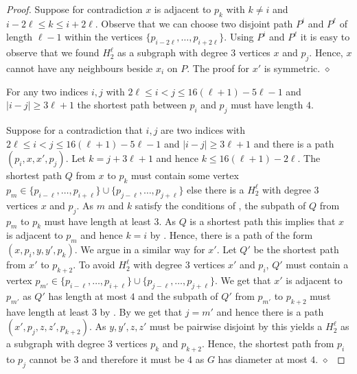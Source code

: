\documentclass[runningheads,envcountsame]{llncs}
\newcommand{\Hgraph}[1]{H_{#1}}
\newenvironment{claimproof}
{\noindent {\em Proof of Claim:} }
{\hfill $\diamond$ \smallskip}
\begin{document}
\begin{proof}
\begin{claimproof}
    Suppose for contradiction $x$ is adjacent to $p_{k}$ with $k\not=i$ and $i-2\ell \leq  k\leq i+2\ell$. Observe that we can choose two disjoint path $P^i$ and $P^\ell$ of length $\ell-1$ within the vertices $\{p_{i-2\ell},\dots, p_{i+2\ell}\}$. Using $P^i$ and $P^\ell$ it is easy to observe that we found $\Hgraph{2}^{\ell}$ as a subgraph with degree $3$ vertices $x$ and $p_j$. Hence, $x$ cannot have any neighbours beside $x_i$ on $P$. The proof for $x'$ is symmetric.
\end{claimproof}
\begin{mclaim}\label{claim:HGraph_distance4}
    For any two indices $i,j$ with $2\ell \leq i < j \leq 16(\ell+1)-5\ell-1$ and $|i-j| \geq 3\ell+1$ the shortest path between $p_{i}$ and $p_j$ must have length $4$.
\end{mclaim}
\begin{claimproof}
    Suppose for a contradiction that $i,j$ are two indices with  $2\ell \leq i < j \leq 16(\ell+1)-5\ell-1$ and $|i-j| \geq 3\ell+1$ and there is a path $(p_i,x,x',p_j)$. 
    Let $k = j+3\ell+1$ and hence $k\leq 16(\ell+1)-2\ell$. The shortest path $Q$ from $x$ to $p_k$ must contain some vertex $p_{m} \in \{p_{i-\ell}, \dots, p_{i+\ell}\} \cup \{p_{j-\ell}, \dots, p_{j+\ell}\}$ else there is a $\Hgraph{2}^{\ell}$ with degree $3$ vertices $x$ and $p_{j}$. 
    As $m$ and $k$ satisfy the conditions of , the subpath of $Q$ from $p_m$ to $p_k$ must have length at least $3$. As $Q$ is a shortest path this implies that $x$ is adjacent to $p_m$ and hence $k=i$ by . Hence, there is a path of the form $(x,p_i,y,y',p_k)$. 
    We argue in a similar way for $x'$. Let $Q'$ be the shortest path from $x'$ to $p_{k+2}$. To avoid $\Hgraph{2}^{\ell}$ with degree 3 vertices $x'$ and $p_{i}$, $Q'$ must contain a vertex $p_{m'} \in \{p_{i-\ell}, \dots, p_{i+\ell}\} \cup \{p_{j-\ell}, \dots, p_{j+\ell}\}$. We get that $x'$ is adjacent to $p_{m'}$ as $Q'$ has length at most $4$ and the subpath of $Q'$ from $p_{m'}$ to $p_{k+2}$ must have length at least $3$ by . By  we get that $j=m'$ and hence there is a path $(x',p_j,z,z',p_{k+2})$. As $y,y',z,z'$ must be pairwise disjoint by  this yields a  $\Hgraph{2}^{\ell}$ as a subgraph with degree $3$ vertices $p_k$ and $p_{k+2}$.
    Hence, the shortest path from $p_i$ to $p_j$ cannot be $3$ and therefore it must be $4$ as $G$ has diameter at most $4$.
\end{claimproof}
    

\end{proof}
\end{document}
